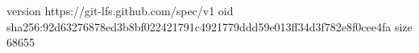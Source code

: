 version https://git-lfs.github.com/spec/v1
oid sha256:92d63276878ed3b8bf022421791c4921779ddd59e013ff34d3f782e8f0cee4fa
size 68655
